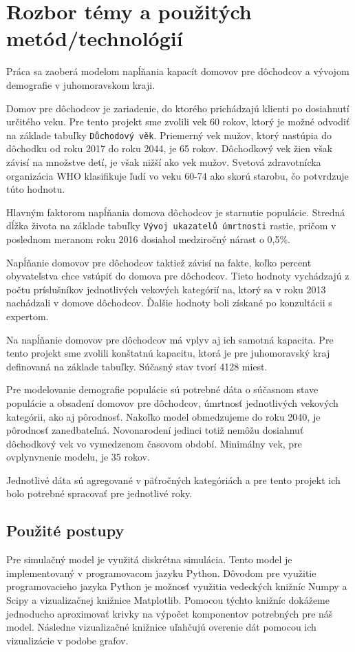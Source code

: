 \documentclass[a4paper, 11pt]{article}
\begin{document}
\section{Rozbor témy a použitých metód/technológií}
Práca sa zaoberá modelom napĺňania kapacít domovov pre dôchodcov a vývojom demografie v juhomoravskom kraji. 

Domov pre dôchodcov je zariadenie, do ktorého prichádzajú klienti po dosiahnutí určitého veku. Pre tento projekt sme zvolili vek 60 rokov, ktorý je možné odvodiť na základe tabuľky \texttt{Důchodový věk}\cite{duchod}. Priemerný vek mužov, ktorý nastúpia do dôchodku od roku 2017 do roku 2044, je 65 rokov. Dôchodkový vek žien však závisí na množstve detí, je však nižší ako vek mužov. Svetová zdravotnícka organizácia WHO klasifikuje ľudí vo veku 60-74 ako skorú starobu\cite{pac}, čo potvrdzuje túto hodnotu.

Hlavným faktorom napĺňania domova dôchodcov je starnutie populácie. Stredná dĺžka života na základe tabuľky \texttt{Vývoj ukazatelů úmrtnosti} \cite[str. 8]{zomreli} rastie, pričom v poslednom meranom roku 2016 dosiahol medziročný nárast o 0,5\%.

Napĺňanie domovov pre dôchodcov taktiež závisí na fakte, koľko percent obyvateľstva chce vstúpiť do domova pre dôchodcov. Tieto hodnoty vychádzajú z počtu príslušníkov jednotlivých vekových kategórií na, ktorý sa v roku 2013 nachádzali v domove dôchodcov\cite{domovy}. Ďalšie hodnoty boli získané po konzultácii s expertom.

Na napĺňanie domovov pre dôchodcov má vplyv aj ich samotná kapacita. Pre tento projekt sme zvolili konštatnú kapacitu, ktorá je pre juhomoravský kraj definovaná na základe tabuľky\cite{miesta}. Súčasný stav tvorí 4128 miest.  

Pre modelovanie demografie populácie sú potrebné dáta o súčasnom stave populácie\cite{demografia} a obsadení domovov pre dôchodcov\cite{domovy}, úmrtnosť jednotlivých vekových kategórii\cite{zomreli}, ako aj pôrodnosť. Nakoľko model obmedzujeme do roku 2040, je pôrodnosť zanedbateľná. Novonarodení jedinci totiž nemôžu dosiahnuť dôchodkový vek vo vymedzenom časovom období. Minimálny vek, pre ovplynvnenie modelu, je 35 rokov.

Jednotlivé dáta sú agregované v päťročných kategóriách a pre tento projekt ich bolo potrebné spracovať pre jednotlivé roky.

\subsection{Použité postupy}
Pre simulačný model\cite[str. 44]{IMS} je využitá diskrétna simulácia\cite[str. 34]{IMS}. Tento model je implementovaný v programovacom jazyku Python. Dôvodom pre využitie programovacieho jazyka Python je možnosť využitia vedeckých knižníc Numpy a Scipy a vizualizačnej knižnice Matplotlib. Pomocou týchto knižníc dokážeme jednoducho aproximovať krivky na výpočet komponentov potrebných pre náš model. Následne vizualizačné knižnice uľahčujú overenie dát pomocou ich vizualizácie v podobe grafov.
\end{document}
